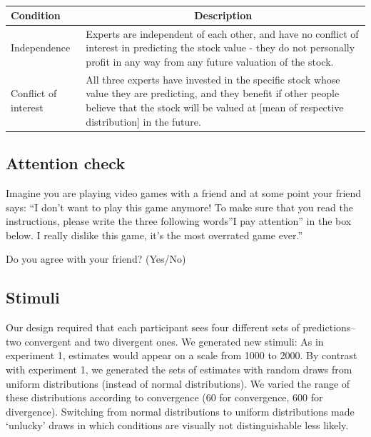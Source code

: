\documentclass[
  doc,floatsintext]{apa6}
\begin{document}
\begin{table}[tbp]

\begin{center}
\begin{threeparttable}

\caption{\label{tab:conditions-exp3}}

\begin{tabular}{m{3cm}m{12cm}}
\toprule
Condition & \multicolumn{1}{c}{Description}\\
\midrule
Independence & Experts are independent of each other, and have no conflict of interest in predicting the stock value - they do not personally profit in any way from any future valuation of the stock.\\
Conflict of interest & All three experts have invested in the specific stock whose value they are predicting, and they benefit if other people believe that the stock will be valued at [mean of respective distribution] in the future.\\
\bottomrule
\end{tabular}

\end{threeparttable}
\end{center}

\end{table}

\subsection{Attention check}\label{attention-check-2}

Imagine you are playing video games with a friend and at some point your friend says: ``I don't want to play this game anymore! To make sure that you read the instructions, please write the three following words''I pay attention'' in the box below. I really dislike this game, it's the most overrated game ever.''

Do you agree with your friend? (Yes/No)

\subsection{Stimuli}\label{stimuli-1}

Our design required that each participant sees four different sets of predictions--two convergent and two divergent ones. We generated new stimuli: As in experiment 1, estimates would appear on a scale from 1000 to 2000. By contrast with experiment 1, we generated the sets of estimates with random draws from uniform distributions (instead of normal distributions). We varied the range of these distributions according to convergence (60 for convergence, 600 for divergence). Switching from normal distributions to uniform distributions made `unlucky' draws in which conditions are visually not distinguishable less likely.
\end{document}
